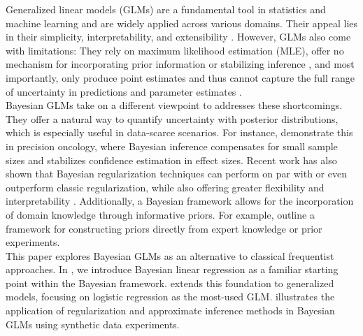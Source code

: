Generalized linear models (GLMs) are a fundamental tool in statistics and machine learning and are widely applied across various domains.
Their appeal lies in their simplicity, interpretability, and extensibility \citep{nelder_generalized_1972}.
However, GLMs also come with limitations:
They rely on maximum likelihood estimation (MLE), offer no mechanism for incorporating prior information or stabilizing inference \citep{gelman_weakly_2008}, and most importantly, only produce point estimates and thus cannot capture the full range of uncertainty in predictions and parameter estimates \citep{tyralis_review_2024}.\\

Bayesian GLMs take on a different viewpoint to addresses these shortcomings.
They offer a natural way to quantify uncertainty with posterior distributions, which is especially useful in data-scarce scenarios.
For instance, \citet{sondhi_bayesian_2021} demonstrate this in precision oncology, where Bayesian inference compensates for small sample sizes and stabilizes confidence estimation in effect sizes.
Recent work has also shown that Bayesian regularization techniques can perform on par with or even outperform classic regularization, while also offering greater flexibility and interpretability \citep{van_erp_shrinkage_2019,celeux_regularization_2012}.
Additionally, a Bayesian framework allows for the incorporation of domain knowledge through informative priors.
For example, \citet{chien_informative_2023} outline a framework for constructing priors directly from expert knowledge or prior experiments.\\

This paper explores Bayesian GLMs as an alternative to classical frequentist approaches.
In , we introduce Bayesian linear regression as a familiar starting point within the Bayesian framework.
 extends this foundation to generalized models, focusing on logistic regression as the most-used GLM.
 illustrates the application of regularization and approximate inference methods in Bayesian GLMs using synthetic data experiments.\\



